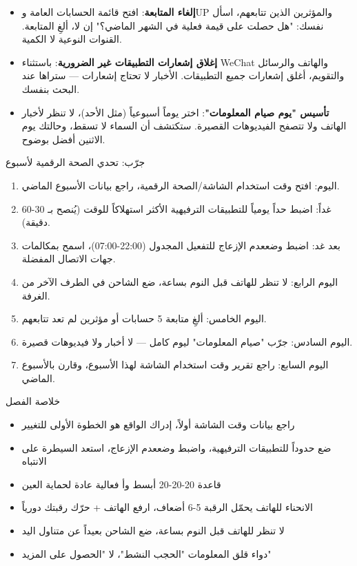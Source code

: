 \begin{itemize}
  \item \textbf{إلغاء المتابعة}: افتح قائمة الحسابات العامة وUP والمؤثرين الذين تتابعهم، اسأل نفسك: "هل حصلت على قيمة فعلية في الشهر الماضي؟" إن لا، ألغِ المتابعة. القنوات النوعية لا الكمية.
  \item \textbf{إغلاق إشعارات التطبيقات غير الضرورية}: باستثناء WeChat والهاتف والرسائل والتقويم، أغلق إشعارات جميع التطبيقات. الأخبار لا تحتاج إشعارات — ستراها عند البحث بنفسك.
  \item \textbf{تأسيس "يوم صيام المعلومات"}: اختر يوماً أسبوعياً (مثل الأحد)، لا تنظر لأخبار الهاتف ولا تتصفح الفيديوهات القصيرة. ستكتشف أن السماء لا تسقط، وحالتك يوم الاثنين أفضل بوضوح.
\end{itemize}

\begin{tcbpractice}{جرّب: تحدي الصحة الرقمية لأسبوع}
\begin{enumerate}
  \item اليوم: افتح وقت استخدام الشاشة/الصحة الرقمية، راجع بيانات الأسبوع الماضي.
  \item غداً: اضبط حداً يومياً للتطبيقات الترفيهية الأكثر استهلاكاً للوقت (يُنصح بـ 30-60 دقيقة).
  \item بعد غد: اضبط وضععدم الإزعاج للتفعيل المجدول (22:00-07:00)، اسمح بمكالمات جهات الاتصال المفضلة.
  \item اليوم الرابع: لا تنظر للهاتف قبل النوم بساعة، ضع الشاحن في الطرف الآخر من الغرفة.
  \item اليوم الخامس: ألغِ متابعة 5 حسابات أو مؤثرين لم تعد تتابعهم.
  \item اليوم السادس: جرّب "صيام المعلومات" ليوم كامل — لا أخبار ولا فيديوهات قصيرة.
  \item اليوم السابع: راجع تقرير وقت استخدام الشاشة لهذا الأسبوع، وقارن بالأسبوع الماضي.
\end{enumerate}

\end{tcbpractice}

\begin{tcbsummary}{خلاصة الفصل}
\begin{itemize}
  \item راجع بيانات وقت الشاشة أولاً، إدراك الواقع هو الخطوة الأولى للتغيير
  \item ضع حدوداً للتطبيقات الترفيهية، واضبط وضععدم الإزعاج، استعد السيطرة على الانتباه
  \item قاعدة 20-20-20 أبسط وأ فعالية عادة لحماية العين
  \item الانحناء للهاتف يحمّل الرقبة 5-6 أضعاف، ارفع الهاتف + حرّك رقبتك دورياً
  \item لا تنظر للهاتف قبل النوم بساعة، ضع الشاحن بعيداً عن متناول اليد
  \item دواء قلق المعلومات "الحجب النشط"، لا "الحصول على المزيد"
\end{itemize}

\end{tcbsummary}
